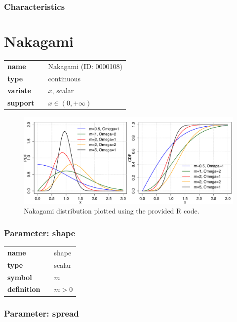 \subsubsection*{Characteristics}
\smallskip
\section*{Nakagami} 

  \bigskip 

\begin{tabular}{p{2cm}cl}
\textbf{name} & & Nakagami (ID: 0000108)\\ 
 
\textbf{type} & & continuous \\ 

\textbf{variate} & & $x$, scalar \\ 

\textbf{support} & & $x \in (0,+\infty)$
\end{tabular}

\begin{figure}[ht!]
\centering
  \includegraphics[width=140mm]{pics/Nakagami.pdf}
 \caption{Nakagami distribution plotted using the provided R code.}
 \label{fig:Nakagami}
\end{figure}

\subsubsection*{Parameter: shape}

\noindent\begin{tabular}{p{2cm}cl}
\textbf{name} & & shape \\
\textbf{type} & & scalar \\
\textbf{symbol} & & $m$  \\
\textbf{definition} & & $m > 0$
\end{tabular}
\subsubsection*{Parameter: spread}

